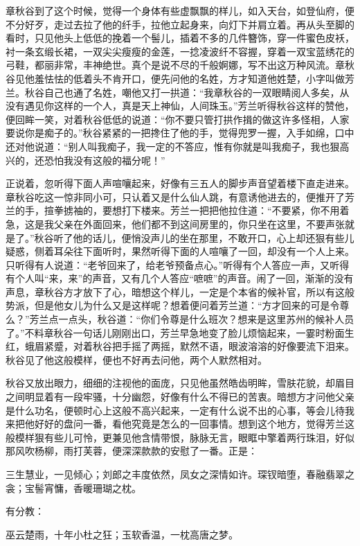 \documentclass[12pt,UTF8]{ctexbook}
\begin{document}
{{{章秋谷到了这个时候，觉得一个身体有些虚飘飘的样儿，如入天台，如登仙府，便不分好歹，走过去拉了他的纤手，拉他立起身来，向灯下并肩立着。再从头至脚的看时，只见他头上低低的挽着一个髻儿，插着不多的几件簪饰，穿一件蜜色皮袄，衬一条玄缎长裙，一双尖尖瘦瘦的金莲，一捻凌波纤不容握，穿着一双宝蓝绣花的弓鞋，都丽非常，丰神绝世。真个是说不尽的千般婀娜，写不出这万种风流。章秋谷见他羞怯怯的低着头不肯开口，便先问他的名姓，方才知道他姓楚，小字叫做芳兰。秋谷自己也通了名姓，嘲他又打一拱道：“我章秋谷的一双眼睛阅人多矣，从没有遇见你这样的一个人，真是天上神仙，人间珠玉。”芳兰听得秋谷这样的赞他，便回眸一笑，对着秋谷低低的说道：“你不要只管打拱作揖的做这许多怪相，人家要说你是痴子的。”秋谷紧紧的一把搀住了他的手，觉得兜罗一握，入手如绵，口中还对他说道：“别人叫我痴子，我一定的不答应，惟有你就是叫我痴子，我也狠高兴的，还恐怕我没有这般的福分呢！”

正说着，忽听得下面人声喧嚷起来，好像有三五人的脚步声音望着楼下直走进来。章秋谷吃这一惊非同小可，只认着又是什么仙人跳，有意诱他进去的，便推开了芳兰的手，揎拳掳袖的，要想打下楼来。芳兰一把把他拉住道：“不要紧，你不用着急，这是我父亲在外面回来，他们都不到这间房里的，你只坐在这里，不要声张就是了。”秋谷听了他的话儿，便悄没声儿的坐在那里，不敢开口，心上却还狠有些儿疑惑，侧着耳朵往下面听时，果然听得下面的人喧嚷了一回，却没有一个人上来。只听得有人说道：“老爷回来了，给老爷预备点心。”听得有个人答应一声，又听得有个人叫“来，来”的声音，又有几个人答应“嗻嗻”的声音。闹了一回，渐渐的没有声息，章秋谷方才放下了心，暗想这个样儿，一定是个本省的候补官，所以有这般势派，但是他女儿为什么又是这样呢？想着便问着芳兰道：“方才回来的可是令尊么？”芳兰点一点头，秋谷道：“你们令尊是什么班次？想来是这里苏州的候补人员了。”不料章秋谷一句话儿刚刚出口，芳兰早急地变了脸儿烦恼起来，一霎时粉面生红，蛾眉紧蹙，对着秋谷把手摇了两摇，默然不语，眼波溶溶的好像要流下泪来。秋谷见了他这般模样，便也不好再去问他，两个人默然相对。

秋谷又放出眼力，细细的注视他的面庞，只见他虽然皓齿明眸，雪肤花貌，却眉目之间明显着有一段牢骚，十分幽怨，好像有什么不得已的苦衷。暗想方才问他父亲是什么功名，便顿时心上这般不高兴起来，一定有什么说不出的心事，等会儿待我来把他好好的盘问一番，看他究竟是怎么的一回事情。想到这个地方，觉得芳兰这般模样狠有些儿可怜，更兼见他含情带恨，脉脉无言，眼眶中擎着两行珠泪，好似那风吹杨柳，雨打芙蓉，便深深款款的安慰了一番。正是：

三生慧业，一见倾心；刘郎之丰度依然，凤女之深情如许。琛钗暗堕，春融翡翠之衾；宝髻宵慵，香暖珊瑚之枕。

有分教：

巫云楚雨，十年小杜之狂；玉软香温，一枕高唐之梦。

}}}
\end{document}
